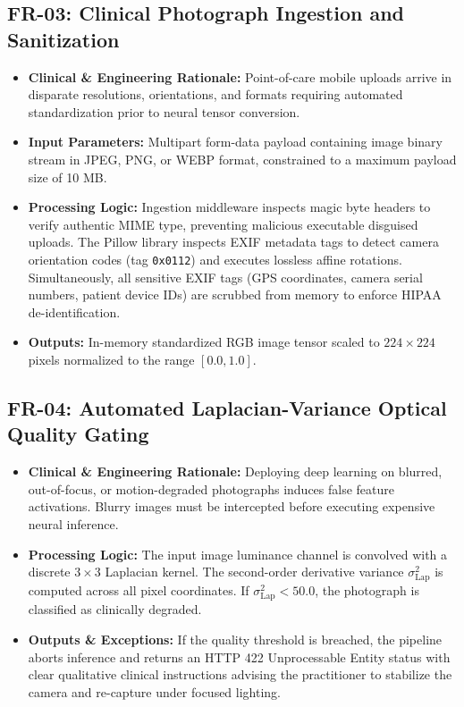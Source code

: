 \documentclass[12pt,a4paper,oneside]{report}
\begin{document}
\subsection{FR-03: Clinical Photograph Ingestion and Sanitization}
\begin{itemize}
    \item \textbf{Clinical \& Engineering Rationale:} Point-of-care mobile uploads arrive in disparate resolutions, orientations, and formats requiring automated standardization prior to neural tensor conversion.
    \item \textbf{Input Parameters:} Multipart form-data payload containing image binary stream in JPEG, PNG, or WEBP format, constrained to a maximum payload size of 10 MB.
    \item \textbf{Processing Logic:} Ingestion middleware inspects magic byte headers to verify authentic MIME type, preventing malicious executable disguised uploads. The Pillow library inspects EXIF metadata tags to detect camera orientation codes (tag \texttt{0x0112}) and executes lossless affine rotations. Simultaneously, all sensitive EXIF tags (GPS coordinates, camera serial numbers, patient device IDs) are scrubbed from memory to enforce HIPAA de-identification.
    \item \textbf{Outputs:} In-memory standardized RGB image tensor scaled to $224 \times 224$ pixels normalized to the range $[0.0, 1.0]$.
\end{itemize}

\subsection{FR-04: Automated Laplacian-Variance Optical Quality Gating}
\begin{itemize}
    \item \textbf{Clinical \& Engineering Rationale:} Deploying deep learning on blurred, out-of-focus, or motion-degraded photographs induces false feature activations. Blurry images must be intercepted before executing expensive neural inference.
    \item \textbf{Processing Logic:} The input image luminance channel is convolved with a discrete $3\times 3$ Laplacian kernel. The second-order derivative variance $\sigma^2_{\text{Lap}}$ is computed across all pixel coordinates. If $\sigma^2_{\text{Lap}} < 50.0$, the photograph is classified as clinically degraded.
    \item \textbf{Outputs \& Exceptions:} If the quality threshold is breached, the pipeline aborts inference and returns an HTTP 422 Unprocessable Entity status with clear qualitative clinical instructions advising the practitioner to stabilize the camera and re-capture under focused lighting.
\end{itemize}
\end{document}
